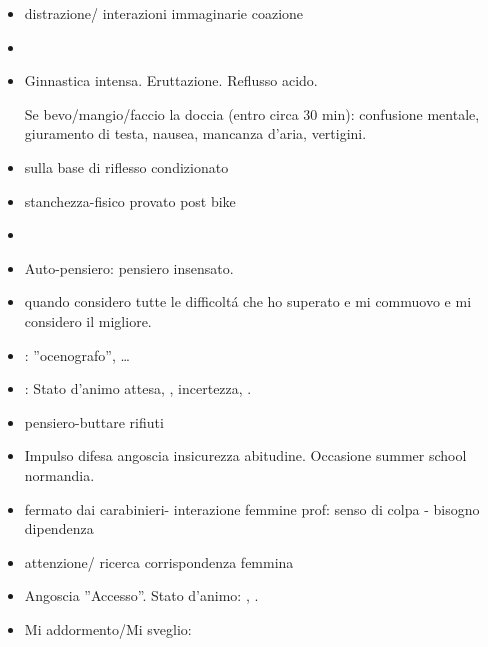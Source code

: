 \begin{itemize}

\item distrazione/ interazioni immaginarie coazione

\item {}

\item Ginnastica intensa. Eruttazione. Reflusso acido.

Se bevo/mangio/faccio la doccia (entro circa 30 min): confusione mentale, giuramento di testa, nausea, mancanza d’aria, vertigini.

\item {} sulla base di riflesso condizionato

\item stanchezza-fisico provato post bike

\item {}

\item Auto-pensiero: pensiero insensato.

\item {} quando considero tutte le difficolt\'a che ho superato e mi commuovo e mi considero il migliore. 

\item {}: ''ocenografo'', \ldots

\item {}: Stato d'animo attesa, , incertezza, .

\item pensiero-buttare rifiuti

\item Impulso difesa angoscia insicurezza abitudine.
Occasione summer school normandia.

\item fermato dai carabinieri- interazione femmine prof: senso di colpa - bisogno dipendenza

\item attenzione/ ricerca corrispondenza femmina

\item Angoscia ''Accesso''. Stato d’animo: , .

\item Mi addormento/Mi sveglio: 


\end{itemize}
